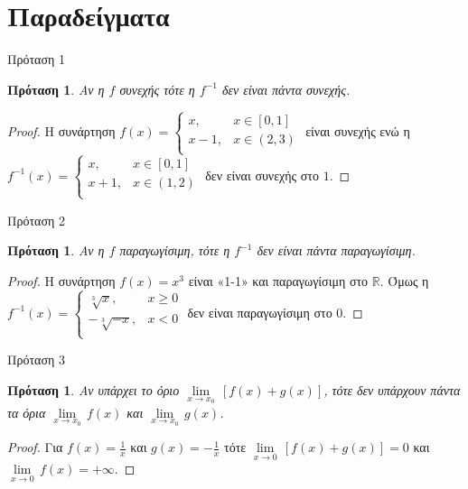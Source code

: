 \documentclass[greek]{beamer}
\newtheorem{proposition}[theorem]{Πρόταση}
\begin{document}
\section{Παραδείγματα}
\begin{frame}{Πρόταση 1}
 \begin{proposition}
  \normalfont Αν η $f$ συνεχής τότε η $f^{-1}$ δεν είναι πάντα συνεχής.
 \end{proposition}
 \begin{proof}
  Η συνάρτηση $f\left( x \right)=\left\{ \begin{array}{*{35}{l}}
    x,   & x\in \left[ 0,1 \right] \\
    x-1, & x\in \left( 2,3 \right) \\
   \end{array} \right.$ είναι συνεχής ενώ η ${{f}^{-1}}\left( x \right)=\left\{ \begin{array}{*{35}{l}}
    x,   & x\in \left[ 0,1 \right] \\
    x+1, & x\in \left( 1,2 \right) \\
   \end{array} \right.$ δεν είναι συνεχής στο $1$.
 \end{proof}
\end{frame}

\begin{frame}{Πρόταση 2}
 \begin{proposition}
  \normalfont Αν η $f$ παραγωγίσιμη, τότε η $f^{-1}$ δεν είναι πάντα παραγωγίσιμη.
 \end{proposition}
 \begin{proof}
  Η συνάρτηση $f\left( x \right)={{x}^{3}}$ είναι «1-1» και παραγωγίσιμη στο $\mathbb{R}$. Όμως η ${{f}^{-1}}\left( x \right)=\left\{ \begin{array}{*{35}{l}}
    \sqrt[3]{x},   & x\ge 0 \\
    -\sqrt[3]{-x}, & x<0    \\
   \end{array} \right.$ δεν είναι παραγωγίσιμη στο 0.
 \end{proof}
\end{frame}

\begin{frame}{Πρόταση 3}
 \begin{proposition}
  \normalfont Αν υπάρχει το όριο $\underset{x\to {{x}_{0}}}{\mathop{\lim }}\,\left[ f\left( x \right)+g\left( x \right) \right]$, τότε δεν υπάρχουν πάντα τα όρια $\underset{x\to {{x}_{0}}}{\mathop{\lim }}\,f\left( x \right)$ και $\underset{x\to {{x}_{0}}}{\mathop{\lim }}\,g\left( x \right)$.
 \end{proposition}
 \begin{proof}
  Για $f\left( x \right)=\frac{1}{x}$ και $g\left( x \right)=-\frac{1}{x}$ τότε $\underset{x\to 0}{\mathop{\lim }}\,\left[ f\left( x \right)+g\left( x \right) \right]=0$ και $\underset{x\to 0}{\mathop{\lim }}\,f\left( x \right)=+\infty $.
 \end{proof}
\end{frame}
\end{document}
